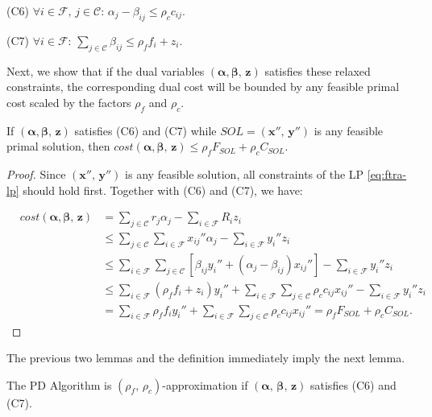 \documentclass[10pt]{llncs}
\begin{document}
\medskip{}


(C6) $\forall i\in\mathcal{F},\, j\in\mathcal{C}:\,\alpha_{j}-\beta_{ij}\leq\rho_{c}c_{ij}$.

(C7) $\forall i\in\mathcal{F}:\,\sum_{j\in\mathcal{C}}\beta_{ij}\leq\rho_{f}f_{i}+z_{i}$.

\medskip{}


Next, we show that if the dual variables $\left(\boldsymbol{\alpha},\boldsymbol{\beta},\,\boldsymbol{z}\right)$
satisfies these relaxed constraints, the corresponding dual cost will
be bounded by any feasible primal cost scaled by the factors $\rho_{f}$
and $\rho_{c}$.
\begin{lemma}
If $\left(\boldsymbol{\alpha},\boldsymbol{\beta},\,\boldsymbol{z}\right)$
satisfies (C6) and (C7) while $SOL=\left(\boldsymbol{x''},\,\boldsymbol{y''}\right)$
is any feasible primal solution, then $cost\left(\boldsymbol{\alpha},\boldsymbol{\beta},\,\boldsymbol{z}\right)\leq\rho_{f}F_{SOL}+\rho_{c}C_{SOL}$.\label{lem:dual-bound}\end{lemma}
\begin{proof}
Since $\left(\boldsymbol{x''},\,\boldsymbol{y''}\right)$ is any feasible
solution, all constraints of the LP \eqref{eq:ftra-lp} should hold
first. Together with (C6) and (C7), we have:

{\small 
\begin{eqnarray*}
 & cost\left(\boldsymbol{\alpha},\boldsymbol{\beta},\,\boldsymbol{z}\right) & =\sum_{j\in\mathcal{C}}r_{j}\alpha_{j}-\sum_{i\in\mathcal{F}}R_{i}z_{i}\\
 &  & \leq\sum_{j\in\mathcal{C}}\sum_{i\in\mathcal{F}}x_{ij}''\alpha_{j}-\sum_{i\in\mathcal{F}}y_{i}''z_{i}\\
 &  & \leq\sum_{i\in\mathcal{F}}\sum_{j\in\mathcal{C}}\left[\beta_{ij}y_{i}''+\left(\alpha_{j}-\beta_{ij}\right)x_{ij}''\right]-\sum_{i\in\mathcal{F}}y_{i}''z_{i}\\
 &  & \leq\sum_{i\in\mathcal{F}}\left(\rho_{f}f_{i}+z_{i}\right)y_{i}''+\sum_{i\in\mathcal{F}}\sum_{j\in\mathcal{C}}\rho_{c}c_{ij}x_{ij}''-\sum_{i\in\mathcal{F}}y_{i}''z_{i}\\
 &  & =\sum_{i\in\mathcal{F}}\rho_{f}f_{i}y_{i}''+\sum_{i\in\mathcal{F}}\sum_{j\in\mathcal{C}}\rho_{c}c_{ij}x_{ij}''=\rho_{f}F_{SOL}+\rho_{c}C_{SOL}.
\end{eqnarray*}
}{\small \par}
\end{proof}
The previous two lemmas and the definition immediately imply the next
lemma.
\begin{lemma}
The PD Algorithm is $\left(\rho_{f},\,\rho_{c}\right)$-approximation
if $\left(\boldsymbol{\alpha},\,\boldsymbol{\beta},\,\boldsymbol{z}\right)$
satisfies (C6) and (C7).\label{lem:appro}
\end{lemma}
\end{document}
